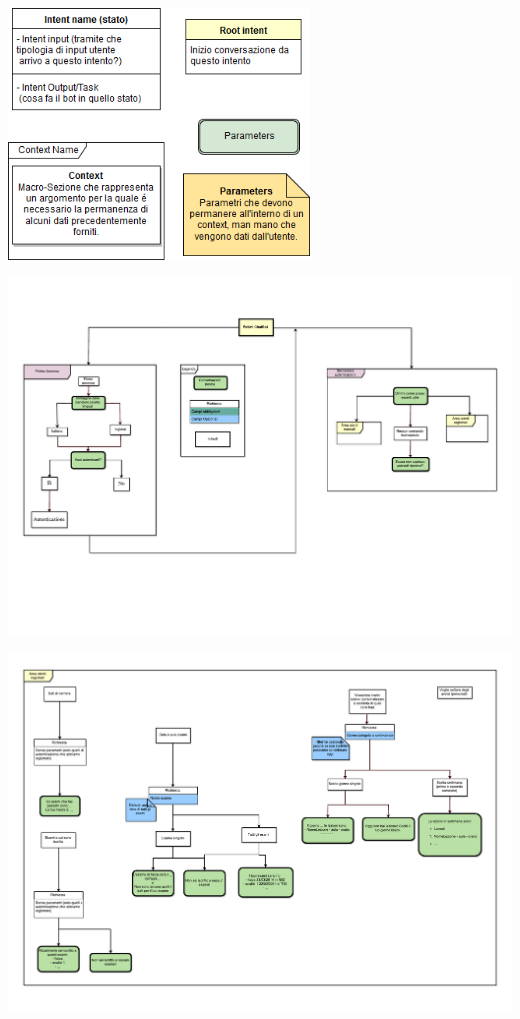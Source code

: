 \documentclass[]{article}
\begin{document}
\begin{center}
\vspace*{0.5cm}
\includegraphics[width=0.6\textwidth]{flow2legend}
\end{center}

\pagebreak
\vspace*{-3cm} 
\includegraphics[width=2\textwidth, angle =90 ]{p01}
\thispagestyle{empty}


\vspace*{-3cm}
\hspace*{-2cm} 
\includegraphics[width=2\textwidth, angle =90 ]{p02}
\thispagestyle{empty}
\end{document}
